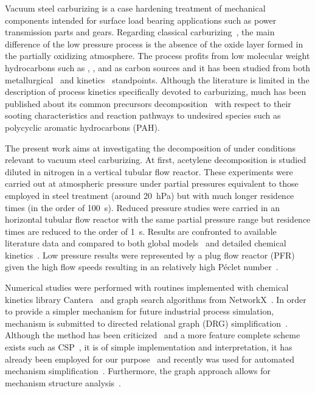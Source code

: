 \documentclass[final,3p,times,twocolumn,sort&compress]{elsarticle}
\begin{document}
Vacuum steel carburizing is a case hardening treatment of mechanical components intended for surface load bearing applications such as power transmission parts and gears. Regarding classical carburizing~\cite{Slycke1981i,Slycke1981ii}, the main difference of the low pressure process is the absence of the oxide layer formed in the partially oxidizing  atmosphere. The process profits from low molecular weight hydrocarbons \textendash{} such as , ,  and  \textendash{} as carbon sources and it has been studied from both metallurgical~\cite{Tsuji1987,Liu2003,Kula2005,Kula201326,Gorockiewicz2010429,Gorockiewicz2011,Zajusz2014646} and kinetics~\cite{Iwata2005,Yada2013,Graf2007,Khan2008} standpoints. Although the literature is limited in the description of process kinetics specifically devoted to carburizing, much has been published about its common precursors decomposition~\cite{Benzinger1996957,Becker1998177,Becker1998201,Becker1998213,Becker1998225,Ziegler2005107,Ziegler2005212,Ziegler2005231,Ziegler2005a,Ziegler2007268,Ziegler201348,Khan2008,Norinaga2005,Norinaga2007,Norinaga2007ii,Norinaga2009,Sanchez201230,Sanchez2013126,Bensabath2016} with respect to their sooting characteristics and reaction pathways to undesired species such as polycyclic aromatic hydrocarbons (PAH).

The present work aims at investigating the decomposition of  under conditions relevant to vacuum steel carburizing. At first, acetylene decomposition is studied diluted in nitrogen in a vertical tubular flow reactor. These experiments were carried out at atmospheric pressure under partial pressures equivalent to those employed in steel treatment (around \SI{20}{\hecto\pascal}) but with much longer residence times (in the order of \SI{100}{\second}). Reduced pressure studies were carried in an horizontal tubular flow reactor with the same partial pressure range but residence times are reduced to the order of \SI{1}{\second}. Results are confronted to available literature data and compared to both global models~\cite{Zwietering1959,Norinaga2005,Graf2007} and detailed chemical kinetics~\cite{Norinaga2009}. Low pressure results were represented by a plug flow reactor (PFR) given the high flow speeds resulting in an relatively high Péclet number~\cite{Fogler1999}.

Numerical studies were performed with routines implemented with chemical kinetics library Cantera~\cite{Cantera2014} and graph search algorithms from NetworkX~\cite{Networkx2016}. In order to provide a simpler mechanism for future industrial process simulation, \citet{Norinaga2009} mechanism is submitted to directed relational graph (DRG) simplification~\cite{Lu2005,Lu2006i,Lu2006ii,Pepiot2008}. Although the method has been criticized~\cite{Coles2011} and a more feature complete scheme exists such as CSP~\cite{Lam1993,Lam1994,Ortega2007}, it is of simple implementation and interpretation, it has already been employed for our purpose~\cite{Liang2009} and recently was used for automated mechanism simplification~\cite{Curtis2015}. Furthermore, the graph approach allows for mechanism structure analysis~\cite{Toth2015}.
\end{document}
